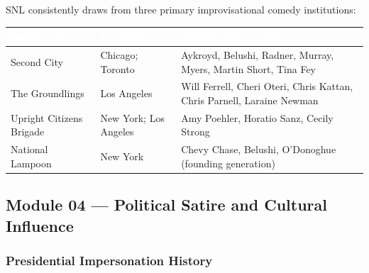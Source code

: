 \documentclass[11pt,letterpaper]{article}
\newcommand{\tableheader}[1]{\textbf{\sffamily\textcolor{white}{#1}}}
\begin{document}
SNL consistently draws from three primary improvisational comedy institutions:

\begin{center}
\begin{tabularx}{\textwidth}{L{3.5cm}XX}
\toprule
{}
\tableheader{Institution} & \tableheader{Location} & \tableheader{Notable SNL Alumni} \\
\midrule
Second City & Chicago; Toronto & Aykroyd, Belushi, Radner, Murray, Myers, Martin Short, Tina Fey \\
The Groundlings & Los Angeles & Will Ferrell, Cheri Oteri, Chris Kattan, Chris Parnell, Laraine Newman \\
Upright Citizens Brigade & New York; Los Angeles & Amy Poehler, Horatio Sanz, Cecily Strong \\
National Lampoon & New York & Chevy Chase, Belushi, O'Donoghue (founding generation) \\
\bottomrule
\end{tabularx}
\end{center}

\subsection{Module 04 --- Political Satire and Cultural Influence}

\subsubsection{Presidential Impersonation History}
\end{document}
